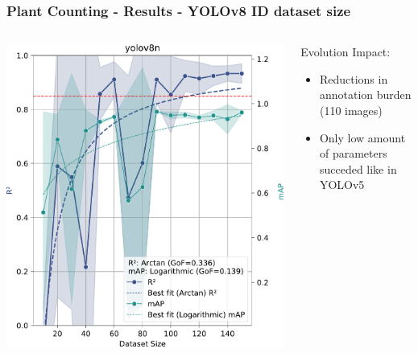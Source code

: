 \documentclass[aspectratio=43]{beamer}
\begin{document}
\begin{frame}
    \frametitle{\small Plant Counting - Results - YOLOv8 ID dataset size}
    \begin{columns}
        \begin{column}{0.5\textwidth}
            \begin{center}
                \includegraphics[width=1\textwidth]{Imgs/r2_ap_vs_dataset_size_yolov8_2.pdf}
            \end{center}
        \end{column}
        
        \begin{column}{0.5\textwidth}
            \begin{block}{Evolution Impact:}
                \scriptsize
                \begin{itemize}
                \item Reductions in annotation burden (110 images)
                \item Only low amount of parameters succeded like in YOLOv5
                \end{itemize}
            \end{block}
        \end{column}
    \end{columns}
\end{frame}
\end{document}
